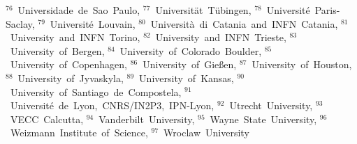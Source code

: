 {$^{76}$~Universidade~de~Sao~Paulo,
$^{77}$~Universit\"{a}t~T\"{u}bingen,
$^{78}$~Universit\'e~Paris-Saclay,
$^{79}$~Universit\'{e}~Louvain,
$^{80}$~Universit\`a~di~Catania~and~INFN~Catania,
$^{81}$~University~and~INFN~Torino,
$^{82}$~University~and~INFN~Trieste,
$^{83}$~University~of~Bergen,
$^{84}$~University~of~Colorado~Boulder,
$^{85}$~University~of~Copenhagen,
$^{86}$~University~of~Gie{\ss}en,
$^{87}$~University~of~Houston,
$^{88}$~University~of~Jyvaskyla,
$^{89}$~University~of~Kansas,
$^{90}$~University~of~Santiago~de~Compostela,
$^{91}$~Universit{\'e}~de~Lyon,~CNRS/IN2P3,~IPN-Lyon,
$^{92}$~Utrecht~University,
$^{93}$~VECC~Calcutta,
$^{94}$~Vanderbilt~University,
$^{95}$~Wayne~State~University,
$^{96}$~Weizmann~Institute~of~Science,
$^{97}$~Wroclaw~University
}
